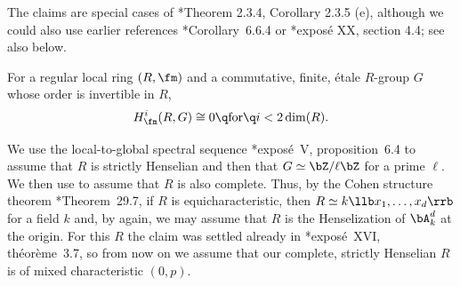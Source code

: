 \bpf
The claims are special cases of \cite{BC19}*{Theorem 2.3.4, Corollary 2.3.5 (e)}, although we could also use earlier references \cite{Fuj95}*{Corollary~6.6.4} or \cite{ILO14}*{expos\'{e} XX, section 4.4}; %
see also  below.
\epf




\bthm {}
For a regular local ring $(R, \fm)$ and a commutative, finite, \'{e}tale $R$-group $G$ whose order is invertible in $R$,
\[
H^i_\fm(R, G) \cong 0 \q \text{for} \q i < 2 \dim(R).
\]
\ethm

\bpf
We use the local-to-global spectral sequence \cite{SGA4II}*{expos\'{e}~V, proposition~6.4} to assume that $R$ is strictly Henselian and then that $G \simeq \bZ/\ell\bZ$ for a prime $\ell$. We then use  to assume
that $R$ is also complete. Thus, by the Cohen structure theorem \cite{Mat89}*{Theorem~29.7}, if $R$ is equicharacteristic, then $R \simeq k\llb x_1, \dotsc, x_d\rrb$ for a field $k$ and, by  again, we may assume that $R$ is the Henselization of $\bA^d_k$ at the origin. For this $R$ the claim was settled already in \cite{SGA4III}*{expos\'{e}~XVI, th\'{e}or\`{e}me~3.7}, so from now on we assume that our complete, strictly Henselian $R$ is of mixed characteristic $(0, p)$.

